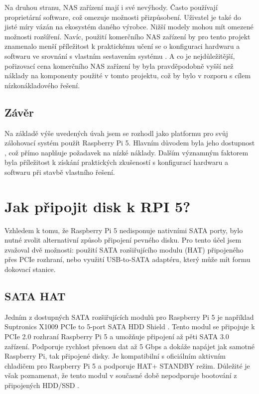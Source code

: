 \documentclass[a4paper,12pt, oneside]{book}
\begin{document}
Na druhou stranu, NAS zařízení mají i své nevýhody. Často používají proprietární
software, což omezuje možnosti přizpůsobení. Uživatel je také do jisté míry
vázán na ekosystém daného výrobce. Nižší modely mohou mít omezené možnosti
rozšíření. Navíc, použití komerčního NAS zařízení by pro tento projekt znamenalo
menší příležitost k praktickému učení se o konfiguraci hardwaru a softwaru ve
srovnání s vlastním sestavením systému . A co je nejdůležitější, pořizovací cena
komerčního NAS zařízení by byla pravděpodobně vyšší než náklady na komponenty
použité v tomto projektu, což by bylo v rozporu s cílem nízkonákladového řešení.  

\subsection{Závěr}



Na základě výše uvedených úvah jsem se rozhodl jako platformu pro svůj
zálohovací systém použít Raspberry Pi 5. Hlavním důvodem byla jeho dostupnost
, což přímo naplňuje
požadavek na nízké náklady. Dalším významným faktorem byla příležitost k získání
praktických zkušeností s konfigurací hardwaru a softwaru při stavbě vlastního
řešení.


\section{Jak připojit disk k RPI 5?}

Vzhledem k tomu, že Raspberry Pi 5 nedisponuje nativními SATA porty, bylo nutné
zvolit alternativní způsob připojení pevného disku. Pro tento účel jsem zvažoval
dvě možnosti: použití SATA rozšiřujícího modulu (HAT) připojeného přes
PCIe rozhraní, nebo využití USB-to-SATA adaptéru, který může mít formu
dokovací stanice.

\subsection{SATA HAT}
Jedním z dostupných SATA rozšiřujících modulů pro Raspberry Pi 5 je například
Suptronics X1009 PCIe to 5-port SATA HDD Shield . Tento modul se připojuje k
PCIe 2.0 rozhraní Raspberry Pi 5 a umožňuje připojení až pěti SATA 3.0 zařízení.
Podporuje rychlost přenosu dat až 5 Gbps a dokáže napájet jak samotné Raspberry
Pi, tak připojené disky. Je kompatibilní s oficiálním aktivním chladičem pro
Raspberry Pi 5 a podporuje HAT+ STANDBY režim. Důležité je však poznamenat, že
tento modul v současné době nepodporuje bootování z připojených HDD/SSD .
\end{document}
